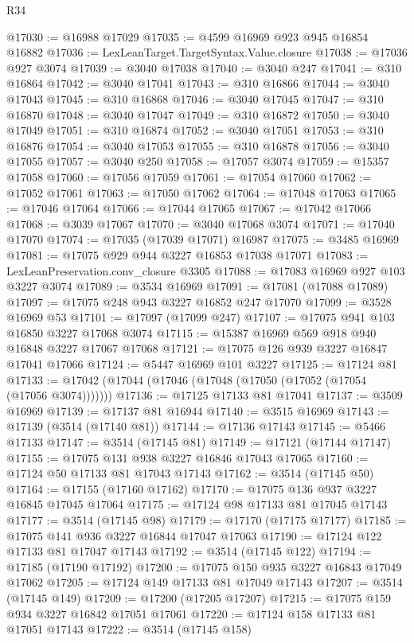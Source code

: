 \begin{lexlean}{R34}
\begin{coremodule}
@17030 := @16988 @17029
@17035 := @4599 @16969 @923 @945 @16854 @16882
@17036 := LexLeanTarget.TargetSyntax.Value.closure
@17038 := @17036 @927 @3074
@17039 := @3040 @17038
@17040 := @3040 @247
@17041 := @310 @16864
@17042 := @3040 @17041
@17043 := @310 @16866
@17044 := @3040 @17043
@17045 := @310 @16868
@17046 := @3040 @17045
@17047 := @310 @16870
@17048 := @3040 @17047
@17049 := @310 @16872
@17050 := @3040 @17049
@17051 := @310 @16874
@17052 := @3040 @17051
@17053 := @310 @16876
@17054 := @3040 @17053
@17055 := @310 @16878
@17056 := @3040 @17055
@17057 := @3040 @250
@17058 := @17057 @3074
@17059 := @15357 @17058
@17060 := @17056 @17059
@17061 := @17054 @17060
@17062 := @17052 @17061
@17063 := @17050 @17062
@17064 := @17048 @17063
@17065 := @17046 @17064
@17066 := @17044 @17065
@17067 := @17042 @17066
@17068 := @3039 @17067
@17070 := @3040 @17068 @3074
@17071 := @17040 @17070
@17074 := @17035 (@17039 @17071) @16987
@17075 := @3485 @16969
@17081 := @17075 @929 @944 @3227 @16853 @17038 @17071
@17083 := LexLeanPreservation.conv_closure @3305
@17088 := @17083 @16969 @927 @103 @3227 @3074
@17089 := @3534 @16969
@17091 := @17081 (@17088 @17089)
@17097 := @17075 @248 @943 @3227 @16852 @247 @17070
@17099 := @3528 @16969 @53
@17101 := @17097 (@17099 @247)
@17107 := @17075 @941 @103 @16850 @3227 @17068 @3074
@17115 := @15387 @16969 @569 @918 @940 @16848 @3227 @17067 @17068
@17121 := @17075 @126 @939 @3227 @16847 @17041 @17066
@17124 := @5447 @16969 @101 @3227
@17125 := @17124 @81
@17133 := @17042 (@17044 (@17046 (@17048 (@17050 (@17052 (@17054 (@17056 @3074)))))))
@17136 := @17125 @17133 @81 @17041
@17137 := @3509 @16969
@17139 := @17137 @81 @16944
@17140 := @3515 @16969
@17143 := @17139 (@3514 (@17140 @81))
@17144 := @17136 @17143
@17145 := @5466 @17133
@17147 := @3514 (@17145 @81)
@17149 := @17121 (@17144 @17147)
@17155 := @17075 @131 @938 @3227 @16846 @17043 @17065
@17160 := @17124 @50 @17133 @81 @17043 @17143
@17162 := @3514 (@17145 @50)
@17164 := @17155 (@17160 @17162)
@17170 := @17075 @136 @937 @3227 @16845 @17045 @17064
@17175 := @17124 @98 @17133 @81 @17045 @17143
@17177 := @3514 (@17145 @98)
@17179 := @17170 (@17175 @17177)
@17185 := @17075 @141 @936 @3227 @16844 @17047 @17063
@17190 := @17124 @122 @17133 @81 @17047 @17143
@17192 := @3514 (@17145 @122)
@17194 := @17185 (@17190 @17192)
@17200 := @17075 @150 @935 @3227 @16843 @17049 @17062
@17205 := @17124 @149 @17133 @81 @17049 @17143
@17207 := @3514 (@17145 @149)
@17209 := @17200 (@17205 @17207)
@17215 := @17075 @159 @934 @3227 @16842 @17051 @17061
@17220 := @17124 @158 @17133 @81 @17051 @17143
@17222 := @3514 (@17145 @158)

\end{coremodule}
\end{lexlean}
